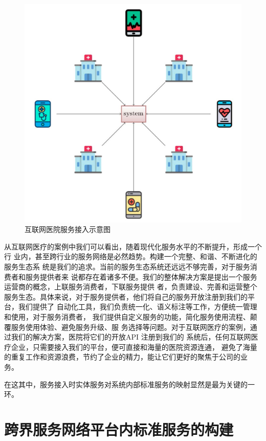 \begin{figure}[htbp]
    \centering
    \includegraphics[scale=0.5]{./images/serverAdvise.jpg}
    \caption{互联网医院服务接入示意图}
    \label{fig:serverAdvise}
  \end{figure}

从互联网医疗的案例中我们可以看出，随着现代化服务水平的不断提升，形成一个行
业内，甚至跨行业的服务网络是必然趋势。构建一个完整、和谐、不断进化的服务生态系
统是我们的追求。当前的服务生态系统还远远不够完善，对于服务消费者和服务提供者来
说都存在着诸多不便。我们的整体解决方案是提出一个服务运营商的概念，上联服务消费者，下联服务提供
者，负责建设、完善和运营整个服务生态。具体来说，对于服务提供者，他们将自己的服务开放注册到我们的平台，我们提供了
自动化工具，我们负责统一化、语义标注等工作，方便统一管理和使用，对于服务消费者，
我们提供自定义服务的功能，简化服务使用流程、颠覆服务使用体验、避免服务升级、服
务选择等问题。对于互联网医疗的案例，通过我们的解决方案，医院将它们的开放API 注册到我们的
系统后，任何互联网医疗企业，只需要接入我们的平台，便可直接和海量的医院资源连通，
避免了海量的重复工作和资源浪费，节约了企业的精力，能让它们更好的聚焦于公司的业
务。

在这其中，服务接入时实体服务对系统内部标准服务的映射显然是最为关键的一环。

\section{跨界服务网络平台内标准服务的构建}


